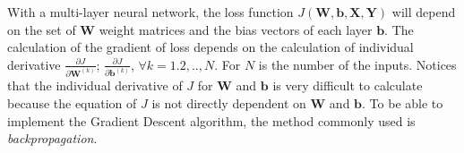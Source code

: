 \documentclass[conference]{IEEEtran}
\begin{document}
With a multi-layer neural network, the loss function $J \left({\boldsymbol{W}}, {\boldsymbol{b}}, {\boldsymbol{X}}, {\boldsymbol{Y}}\right) $ will depend on the set of $ \boldsymbol{W} $ weight matrices and the bias vectors of each layer $ \boldsymbol{b} $. The calculation of the gradient of loss depends on the calculation of individual derivative $ {\frac{{\partial}J}{{{\partial}\boldsymbol{W}} ^ {(k)}}} $; $ {\frac{{\partial}J}{{\partial}\boldsymbol{b} ^ {(k)}}} $, $ {\forall}k = 1.2,.., N $. For $N $ is the number of the inputs. Notices that the individual derivative of $J $ for $ {\boldsymbol{W}} $ and $ {\boldsymbol{b}} $ is very difficult to calculate because the equation of $J $ is not directly dependent on $ {\boldsymbol{W}} $ and $ {\boldsymbol{b}} $. To be able to implement the Gradient Descent algorithm, the method commonly used is \emph{backpropagation}.
\end{document}
